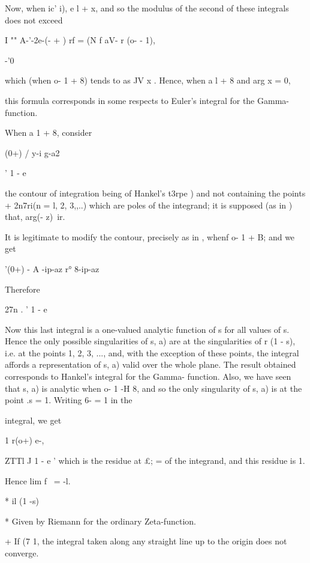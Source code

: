 %
%

Now, when ic' i), e l + x, and so the modulus of the second of these
integrals does not exceed

I "" A-'-2e-(- + ) rf = (N f aV- r (o- - 1),

-'0

which (when o- 1 + 8) tends to as JV x . Hence, when a l + 8 and arg x
= 0,

this formula corresponds in some respects to Euler's integral for the
Gamma- function.

When a 1 + 8,
consider

(0+) / y-i g-a2

' 1 - e

the contour of integration being of Hankel's t3rpe ) and not
containing the points + 2n7ri(n = l, 2, 3,,..) which are poles of the
integrand; it is supposed (as in ) that, arg(- z)\ ir.

It is legitimate to modify the contour, precisely as in , whenf
o- 1 + B; and we get

'(0+) - A -ip-az r° 8-ip-az

Therefore

27n . ' 1 - e

Now this last integral is a one-valued analytic function of s for all
values of s. Hence the only possible singularities of s, a) are at the
singularities of r (1 - s), i.e. at the points 1, 2, 3, ..., and, with
the exception of these points, the integral affords a representation
of s, a) valid over the whole plane. The result obtained corresponds
to Hankel's integral for the Gamma- function. Also, we have seen that
s, a) is analytic when o- 1 -H 8, and so the only singularity of s, a)
is at the point .s = 1. Writing 6- = 1 in the

integral, we get

1 r(o+) e-,

ZTTl J 1 - e ' which is the residue at £; = of the integrand, and this
residue is 1.

Hence lim f \ = -l.

* il (1 -s)

* Given by Riemann for the ordinary Zeta-function.

+ If (7 1, the integral taken along any straight line up to the origin
does not converge.

%
%

